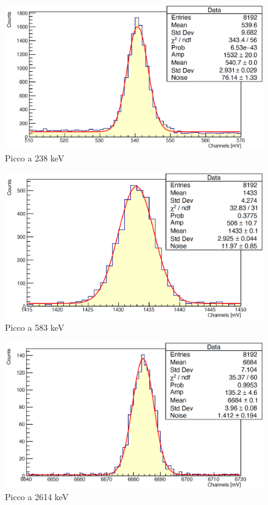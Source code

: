 \documentclass[a4paper,10pt]{article}
\begin{document}
\begin{figure}[H]
    \centering
    \includegraphics[scale=0.45]{appendice/spettri/ThCu1_44}
    \caption{Picco a 238 keV}
\end{figure}
\begin{figure}[H]
    \centering
    \includegraphics[scale=0.45]{appendice/spettri/ThCu2_44}
    \caption{Picco a 583 keV}
\end{figure}
\begin{figure}[H]
    \centering
    \includegraphics[scale=0.45]{appendice/spettri/ThCu3_44}
    \caption{Picco a 2614 keV}
\end{figure}
\end{document}
